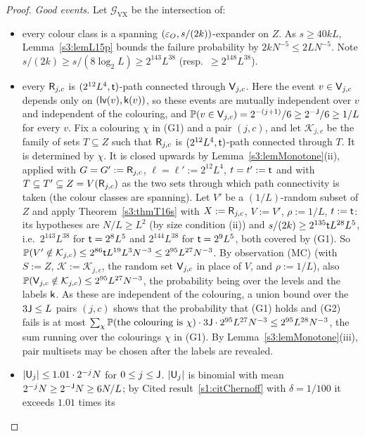 \begin{proof}
\emph{Good events.} Let $\mathcal G_{\mathrm{VX}}$ be the intersection of:
\begin{itemize}
\item[(G1)] every colour class is a spanning $(\varepsilon_O,s/(2k))$-expander on $Z$. As $s\ge40kL$,
  Lemma~\ref{s3:lemL15p} bounds the failure probability by $2kN^{-5}\le2LN^{-5}$. Note
  $s/(2k)\ge s/(8\log_2L)\ge2^{143}L^{38}$ (resp.\ $\ge2^{148}L^{38}$).
\item[(G2)] every $\mathsf{R}_{j,c}$ is $(2^{12}L^4,\mathsf{t})$-path connected through $\mathsf{V}_{j,c}$. Here the event
  $v\in\mathsf{V}_{j,c}$ depends only on $(\mathsf{lv}(v),\mathsf{k}(v))$, so these events are mutually independent over $v$ and
  independent of the colouring, and $\mathbb{P}(v\in\mathsf{V}_{j,c})=2^{-(j+1)}/6\ge2^{-\mathsf{J}}/6\ge1/L$ for every $v$.
  Fix a colouring $\chi$ in (G1) and a pair $(j,c)$, and let $\mathcal K_{j,c}$ be the family of sets
  $T\subseteq Z$ such that $\mathsf{R}_{j,c}$ is $(2^{12}L^4,\mathsf{t})$-path connected through $T$. It is determined by $\chi$.
  It is closed upwards by Lemma~\ref{s3:lemMonotone}(ii), applied with $G=G':=\mathsf{R}_{j,c}$, $\ell=\ell':=2^{12}L^4$,
  $t=t':=\mathsf{t}$ and with $T\subseteq T'\subseteq Z=V(\mathsf{R}_{j,c})$ as the two sets through which path connectivity is
  taken (the colour classes are spanning). Let $V'$ be a $(1/L)$-random subset of $Z$ and apply Theorem~\ref{s3:thmT16s}
  with $X:=\mathsf{R}_{j,c}$, $V:=V'$, $\rho:=1/L$, $t:=\mathsf{t}$: its hypotheses are $N/L\ge L^2$ (by size condition (ii)) and
  $s/(2k)\ge2^{135}\mathsf{t} L^{28}L^5$, i.e.\ $2^{143}L^{38}$ for $\mathsf{t}=2^8L^5$ and $2^{144}L^{38}$ for $\mathsf{t}=2^9L^5$, both
  covered by (G1). So $\mathbb{P}(V'\notin\mathcal K_{j,c})\le2^{86}\mathsf{t} L^{19}L^3N^{-3}\le2^{95}L^{27}N^{-3}$. By
  observation \textup{(MC)} (with $S:=Z$, $\mathcal K:=\mathcal K_{j,c}$, the random set $\mathsf{V}_{j,c}$ in place of $V$,
  and $\rho:=1/L$), also $\mathbb{P}(\mathsf{V}_{j,c}\notin\mathcal K_{j,c})\le2^{95}L^{27}N^{-3}$, the probability being over the
  levels and the labels $\mathsf{k}$. As these are independent of the colouring, a union bound over the $3\mathsf{J}\le L$ pairs
  $(j,c)$ shows that the probability that (G1) holds and (G2) fails is at most
  $\sum_{\chi}\mathbb{P}(\text{the colouring is }\chi)\cdot3\mathsf{J}\cdot2^{95}L^{27}N^{-3}\le2^{95}L^{28}N^{-3}$, the sum
  running over the colourings $\chi$ in (G1). By
  Lemma~\ref{s3:lemMonotone}(iii), pair multisets may be chosen after the labels are revealed.
\item[(G3)] $|\mathsf{U}_j|\le1.01\cdot2^{-j}N$ for $0\le j\le\mathsf{J}$. $|\mathsf{U}_j|$ is binomial with mean
  $2^{-j}N\ge2^{-\mathsf{J}}N\ge6N/L$; by Cited result~\ref{s1:citChernoff} with $\delta=1/100$ it exceeds $1.01$ times its

\end{itemize}
\end{proof}
